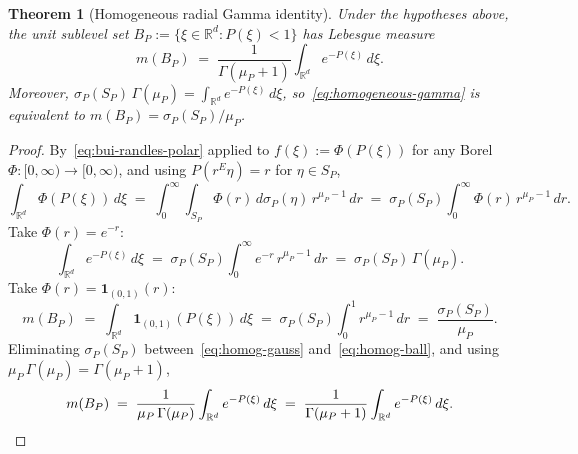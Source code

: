 \documentclass[10pt,a4paper]{amsart}
\newtheorem{theorem}{Theorem}
\newcommand{\R}{\mathbb{R}}
\begin{document}
\begin{theorem}[Homogeneous radial Gamma identity]\label{thm:homogeneous}
Under the hypotheses above, the unit sublevel set $B_P := \{\xi\in\R^d : P(\xi)<1\}$ has Lebesgue measure
\begin{equation}\label{eq:homogeneous-gamma}
m(B_P) \;=\; \frac{1}{\Gamma(\mu_P+1)}\int_{\R^d} e^{-P(\xi)}\,d\xi.
\end{equation}
Moreover, $\sigma_P(S_P)\,\Gamma(\mu_P) = \int_{\R^d} e^{-P(\xi)}\,d\xi$, so~\eqref{eq:homogeneous-gamma} is equivalent to $m(B_P) = \sigma_P(S_P)/\mu_P$.
\end{theorem}

\begin{proof}
By~\eqref{eq:bui-randles-polar} applied to $f(\xi) := \Phi(P(\xi))$ for any Borel $\Phi\colon[0,\infty)\to[0,\infty)$, and using $P(r^E\eta) = r$ for $\eta\in S_P$,
\[
\int_{\R^d}\Phi(P(\xi))\,d\xi \;=\; \int_0^\infty\!\int_{S_P}\Phi(r)\,d\sigma_P(\eta)\,r^{\mu_P-1}\,dr \;=\; \sigma_P(S_P)\int_0^\infty \Phi(r)\,r^{\mu_P-1}\,dr.
\]
Take $\Phi(r) = e^{-r}$:
\begin{equation}\label{eq:homog-gauss}
\int_{\R^d} e^{-P(\xi)}\,d\xi \;=\; \sigma_P(S_P)\int_0^\infty e^{-r}\,r^{\mu_P-1}\,dr \;=\; \sigma_P(S_P)\,\Gamma(\mu_P).
\end{equation}
Take $\Phi(r) = \mathbf 1_{(0,1)}(r)$:
\begin{equation}\label{eq:homog-ball}
m(B_P) \;=\; \int_{\R^d}\mathbf 1_{(0,1)}(P(\xi))\,d\xi \;=\; \sigma_P(S_P)\int_0^1 r^{\mu_P-1}\,dr \;=\; \frac{\sigma_P(S_P)}{\mu_P}.
\end{equation}
Eliminating $\sigma_P(S_P)$ between~\eqref{eq:homog-gauss} and~\eqref{eq:homog-ball}, and using $\mu_P\,\Gamma(\mu_P)=\Gamma(\mu_P+1)$,
\[
m(B_P) \;=\; \frac{1}{\mu_P\,\Gamma(\mu_P)}\int_{\R^d}e^{-P(\xi)}\,d\xi \;=\; \frac{1}{\Gamma(\mu_P+1)}\int_{\R^d}e^{-P(\xi)}\,d\xi. \qedhere
\]
\end{proof}
\end{document}
